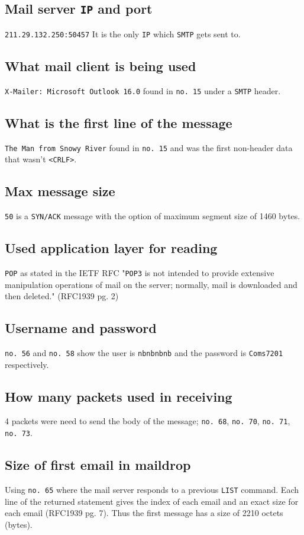 \documentclass{article}
\begin{document}
\subsection{Mail server \texttt{IP} and port}
\texttt{211.29.132.250:50457} It is the only \texttt{IP} which \texttt{SMTP}
gets sent to.

\subsection{What mail client is being used}
\texttt{X-Mailer: Microsoft Outlook 16.0} found in \texttt{no. 15} under a
\texttt{SMTP} header.

\subsection{What is the first line of the message}
\texttt{The Man from Snowy River} found in \texttt{no. 15} and was the first
non-header data that wasn't \texttt{<CRLF>}.

\subsection{Max message size}
\texttt{50} is a \texttt{SYN/ACK} message with the option of maximum segment
size of 1460 bytes.

\subsection{Used application layer for reading}
\texttt{POP} as stated in the IETF RFC "\texttt{POP3} is not intended to
provide extensive manipulation operations of mail on the server; normally,
mail is downloaded and then deleted." (RFC1939 pg. 2)

\subsection{Username and password}
\texttt{no. 56} and \texttt{no. 58} show the user is \texttt{nbnbnbnb} and
the password is \texttt{Coms7201} respectively.

\subsection{How many packets used in receiving}
4 packets were need to send the body of the message;
\texttt{no. 68}, \texttt{no. 70},
\texttt{no. 71}, \texttt{no. 73}.

\subsection{Size of first email in maildrop}
Using \texttt{no. 65} where the mail server responds to a previous
\texttt{LIST} command. Each line of the returned statement gives the index
of each email and an exact size for each email (RFC1939 pg. 7). Thus
the first message has a size of 2210 octets (bytes).
\end{document}

